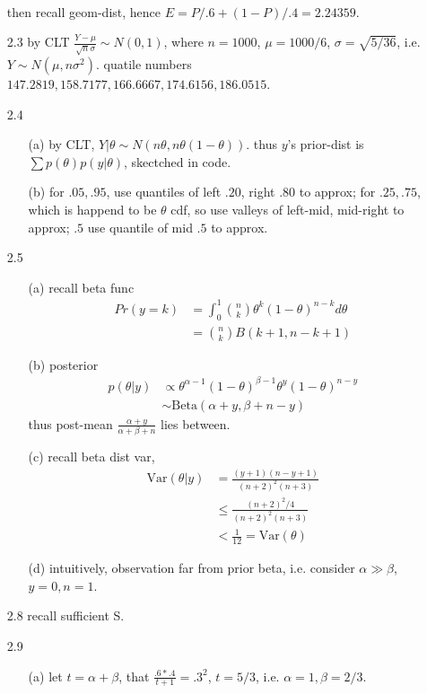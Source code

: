 \documentclass[paper=a4, fontsize=11pt]{scrartcl} %
\numberwithin{equation}{section} %
\numberwithin{figure}{section} %
\numberwithin{table}{section} %
\def \var {\text{Var}}
\begin{document}
\begin{itemize}
\begin{align}
	\end{align}
	then recall geom-dist, hence $E=P/.6+(1-P)/.4 = 2.24359$.
	\item[2.3] by CLT $\frac{Y-\mu}{\sqrt{n}\sigma}\sim N(0,1)$, where $n=1000$, $\mu=1000/6$, $\sigma=\sqrt{5/36}$, i.e. $Y\sim N(\mu, n\sigma^2)$. quatile numbers $147.2819, 158.7177, 166.6667, 174.6156, 186.0515$.
	\item[2.4]
	\begin{itemize}
		\item[(a)] by CLT, $Y|\theta \sim N(n\theta, n\theta(1-\theta))$. thus $y$'s prior-dist is $\sum p(\theta)p(y|\theta)$, skectched in code.
		\item[(b)] for $.05, .95$, use quantiles of left $.20$, right $.80$ to approx; for $.25,.75$, which is happend to be $\theta$ cdf, so use valleys of left-mid, mid-right to approx; $.5$ use quantile of mid $.5$ to approx.
	\end{itemize}
	\item[2.5]
	\begin{itemize}
		\item[(a)] recall beta func
		\begin{align}
			Pr(y=k) &= \int_0^1 {n\choose k} \theta^k(1-\theta)^{n-k}d\theta\\
				&= {n\choose k} B(k+1,n-k+1)
		\end{align}
		\item[(b)] posterior
		\begin{align}
			p(\theta|y) &\propto \theta^{\alpha-1}(1-\theta)^{\beta-1} \theta^y(1-\theta)^{n-y}\\
				&\sim \text{Beta}(\alpha+y,\beta+n-y)
		\end{align}
		thus post-mean $\frac{\alpha+y}{\alpha+\beta+n}$ lies between.
		\item[(c)] recall beta dist var,
		\begin{align}
			\var(\theta|y) &= \frac{(y+1)(n-y+1)}{(n+2)^2(n+3)}\\
				&\leq \frac{(n+2)^2/4}{(n+2)^2(n+3)}\\
				&< \frac{1}{12} = \var(\theta)
		\end{align}
		\item[(d)] intuitively, observation far from prior beta, i.e. consider $\alpha\gg \beta$, $y=0,n=1$.
	\end{itemize}
	\item[2.8] recall sufficient S.
	\item[2.9]
	\begin{itemize}
		\item[(a)] let $t=\alpha+\beta$, that $\frac{.6*.4}{t+1}=.3^2$, $t=5/3$, i.e. $\alpha=1, \beta=2/3$.

\end{itemize}
\end{itemize}
\end{document}
